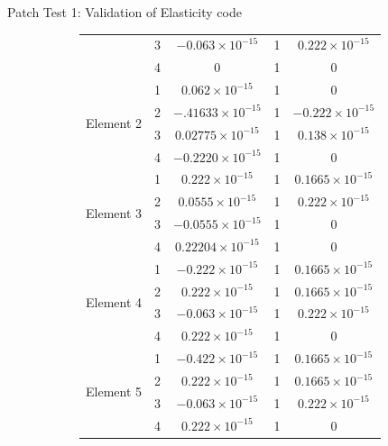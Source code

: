 \documentclass{beamer}
\begin{document}
\begin{frame}[t,fragile]{Patch Test 1: Validation of Elasticity code}
\begin{figure}
\begin{subfigure}{0.45\textwidth}
{\begin{tabular}{|c|c|c|c|c|}
& 3 & $-0.063\times 10^{-15}$ &1& $0.222\times 10^{-15}$\\
& 4 & $0$ &1& $0$\\
\hline
\multirow{4}{5em}{Element 2} & 1 & $0.062\times 10^{-15}$ &1& $0$\\
& 2 & $-.41633\times 10^{-15}$ &1& $-0.222\times 10^{-15}$\\
& 3 & $0.02775\times 10^{-15}$ &1& $0.138\times 10^{-15}$\\
& 4 & $-0.2220\times 10^{-15}$ &1& $0$\\
\hline
\multirow{4}{5em}{Element 3} & 1 & $0.222\times 10^{-15}$ &1& $0.1665\times 10^{-15}$\\
& 2 & $0.0555\times 10^{-15}$ &1& $0.222\times 10^{-15}$\\
& 3 & $-0.0555\times 10^{-15}$ &1& $0$\\
& 4 & $0.22204\times 10^{-15}$ &1& $0$\\
\hline
\multirow{4}{5em}{Element 4} & 1 & $-0.222\times 10^{-15}$ &1& $0.1665\times 10^{-15}$\\
& 2 & $0.222\times 10^{-15}$ &1& $0.1665\times 10^{-15}$\\
& 3 & $-0.063\times 10^{-15}$ &1& $0.222\times 10^{-15}$\\
& 4 & $0.222\times 10^{-15}$ &1& $0$\\
\hline
\multirow{4}{5em}{Element 5} & 1 & $-0.422\times 10^{-15}$ &1& $0.1665\times 10^{-15}$\\
& 2 & $0.222\times 10^{-15}$ &1& $0.1665\times 10^{-15}$\\
& 3 & $-0.063\times 10^{-15}$ &1& $0.222\times 10^{-15}$\\
& 4 & $0.222\times 10^{-15}$ &1& $0$\\
\hline
\end{tabular}}
     \end{subfigure}
  \end{figure}
\end{frame}
\end{document}

